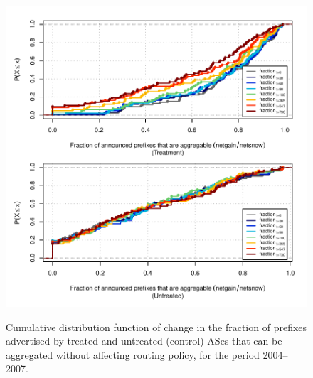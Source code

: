 \begin{figure}[H]
\begin{centering}
\begin{singlespace}
    \includegraphics[width=6in]{figures/behavior-frac_deagg-2004_2007-corr.pdf}
    \vspace{-2em}\\
    \caption{Cumulative distribution function of change in the fraction of
    prefixes advertised by treated and untreated (control) ASes that can be
    aggregated without affecting routing policy, for the period 2004--2007.}
\end{singlespace}
\end{centering}
\end{figure}
